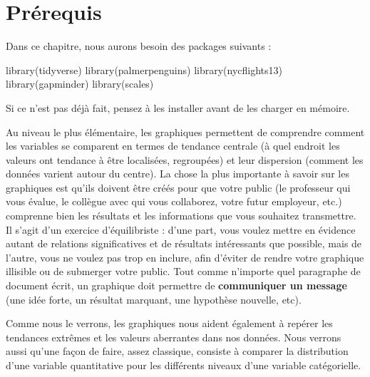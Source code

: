 \documentclass[
  a4paper,
  DIV=11,
  numbers=noendperiod,
  oneside]{scrreprt}
\newenvironment{Shaded}{}{}
\newcommand{\FunctionTok}[1]{\textcolor[rgb]{0.44,0.26,0.76}{#1}}
\newcommand{\NormalTok}[1]{\textcolor[rgb]{0.14,0.16,0.18}{#1}}
\begin{document}
\section{Prérequis}\label{pruxe9requis}

Dans ce chapitre, nous aurons besoin des packages suivants :

\begin{Shaded}
\begin{Highlighting}[]
\FunctionTok{library}\NormalTok{(tidyverse)}
\FunctionTok{library}\NormalTok{(palmerpenguins)}
\FunctionTok{library}\NormalTok{(nycflights13)}
\FunctionTok{library}\NormalTok{(gapminder)}
\FunctionTok{library}\NormalTok{(scales)}
\end{Highlighting}
\end{Shaded}

Si ce n'est pas déjà fait, pensez à les installer avant de les charger
en mémoire.

Au niveau le plus élémentaire, les graphiques permettent de comprendre
comment les variables se comparent en termes de tendance centrale (à
quel endroit les valeurs ont tendance à être localisées, regroupées) et
leur dispersion (comment les données varient autour du centre). La chose
la plus importante à savoir sur les graphiques est qu'ils doivent être
créés pour que votre public (le professeur qui vous évalue, le collègue
avec qui vous collaborez, votre futur employeur, etc.) comprenne bien
les résultats et les informations que vous souhaitez transmettre. Il
s'agit d'un exercice d'équilibriste : d'une part, vous voulez mettre en
évidence autant de relations significatives et de résultats intéressants
que possible, mais de l'autre, vous ne voulez pas trop en inclure, afin
d'éviter de rendre votre graphique illisible ou de submerger votre
public. Tout comme n'importe quel paragraphe de document écrit, un
graphique doit permettre de \textbf{communiquer un message} (une idée
forte, un résultat marquant, une hypothèse nouvelle, etc).

Comme nous le verrons, les graphiques nous aident également à repérer
les tendances extrêmes et les valeurs aberrantes dans nos données. Nous
verrons aussi qu'une façon de faire, assez classique, consiste à
comparer la distribution d'une variable quantitative pour les différents
niveaux d'une variable catégorielle.
\end{document}
